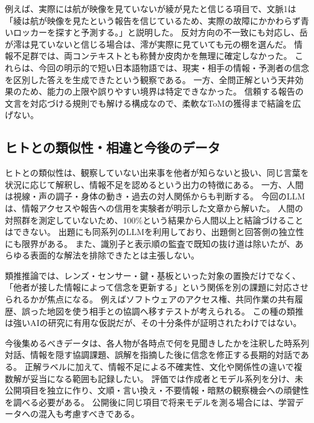 例えば、実際には航が映像を見ていないが綾が見たと信じる項目で、文脈1は「綾は航が映像を見たという報告を信じているため、実際の故障にかかわらず青いロッカーを探すと予測する。」と説明した。
反対方向の不一致にも対応し、岳が澪は見ていないと信じる場合は、澪が実際に見ていても元の棚を選んだ。
情報不足群では、両コンテキストとも称賛か皮肉かを無理に確定しなかった。
これらは、今回の明示的で短い日本語物語では、現実・相手の情報・予測者の信念を区別した答えを生成できたという観察である。
一方、全問正解という天井効果のため、能力の上限や誤りやすい境界は特定できなかった。
信頼する報告の文言を対応づける規則でも解ける構成なので、柔軟なToMの獲得まで結論を広げない。

\subsection{ヒトとの類似性・相違と今後のデータ}
ヒトとの類似性は、観察していない出来事を他者が知らないと扱い、同じ言葉を状況に応じて解釈し、情報不足を認めるという出力の特徴にある。
一方、人間は視線・声の調子・身体の動き・過去の対人関係からも判断する。
今回のLLMは、情報アクセスや報告への信用を実験者が明示した文章から解いた。
人間の対照群を測定していないため、100\%という結果から人間以上と結論づけることはできない。
出題にも同系列のLLMを利用しており、出題側と回答側の独立性にも限界がある。
また、識別子と表示順の監査で既知の抜け道は除いたが、あらゆる表面的な解法を排除できたとは主張しない。

類推推論では、レンズ・センサー・鍵・基板といった対象の置換だけでなく、「他者が接した情報によって信念を更新する」という関係を別の課題に対応させられるかが焦点になる。
例えばソフトウェアのアクセス権、共同作業の共有履歴、誤った地図を使う相手との協調へ移すテストが考えられる。
この種の類推は強いAIの研究に有用な仮説だが、その十分条件が証明されたわけではない。

今後集めるべきデータは、各人物が各時点で何を見聞きしたかを注釈した時系列対話、情報を隠す協調課題、誤解を指摘した後に信念を修正する長期的対話である。
正解ラベルに加えて、情報不足による不確実性、文化や関係性の違いで複数解が妥当になる範囲も記録したい。
評価では作成者とモデル系列を分け、未公開項目を独立に作り、文順・言い換え・不要情報・暗黙の観察機会への頑健性を調べる必要がある。
公開後に同じ項目で将来モデルを測る場合には、学習データへの混入も考慮すべきである\cite{tomreview}。
